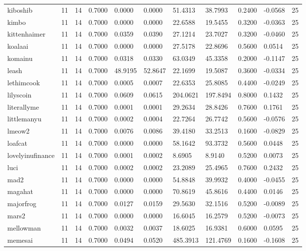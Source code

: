 \begin{table}[htbp]
\begin{tabular}{lllllllllll}
kiboshib & 11 & 14 & 0.7000 & 0.0000 & 0.0000 & 51.4313 & 38.7993 & 0.2400 & -0.0568 & 25 \\
kimbo & 11 & 14 & 0.7000 & 0.0000 & 0.0000 & 22.6588 & 19.5455 & 0.3200 & -0.0363 & 25 \\
kittenhaimer & 11 & 14 & 0.7000 & 0.0359 & 0.0390 & 27.1214 & 23.7027 & 0.3200 & -0.0460 & 25 \\
koalaai & 11 & 14 & 0.7000 & 0.0000 & 0.0000 & 27.5178 & 22.8696 & 0.5600 & 0.0514 & 25 \\
komainu & 11 & 14 & 0.7000 & 0.0318 & 0.0330 & 63.0349 & 45.3358 & 0.2000 & -0.1147 & 25 \\
leash & 11 & 14 & 0.7000 & 48.9195 & 52.8647 & 22.1699 & 19.5087 & 0.3600 & -0.0334 & 25 \\
lethimcook & 11 & 14 & 0.7000 & 0.0005 & 0.0007 & 22.6353 & 25.8085 & 0.4400 & -0.0249 & 25 \\
lilyscoin & 11 & 14 & 0.7000 & 0.0609 & 0.0615 & 204.0621 & 197.8494 & 0.8000 & 0.1432 & 25 \\
literallyme & 11 & 14 & 0.7000 & 0.0001 & 0.0001 & 29.2634 & 28.8426 & 0.7600 & 0.1761 & 25 \\
littlemanyu & 11 & 14 & 0.7000 & 0.0002 & 0.0004 & 22.7264 & 26.7742 & 0.5600 & -0.0576 & 25 \\
lmeow2 & 11 & 14 & 0.7000 & 0.0076 & 0.0086 & 39.4180 & 33.2513 & 0.1600 & -0.0829 & 25 \\
loafcat & 11 & 14 & 0.7000 & 0.0000 & 0.0000 & 58.1642 & 93.3732 & 0.5600 & 0.0448 & 25 \\
lovelyinufinance & 11 & 14 & 0.7000 & 0.0001 & 0.0002 & 8.6905 & 8.9140 & 0.5200 & 0.0073 & 25 \\
luci & 11 & 14 & 0.7000 & 0.0002 & 0.0002 & 23.2089 & 25.4965 & 0.7600 & 0.2432 & 25 \\
mad2 & 11 & 14 & 0.7000 & 0.0000 & 0.0000 & 54.8848 & 39.9932 & 0.4000 & -0.0455 & 25 \\
magahat & 11 & 14 & 0.7000 & 0.0000 & 0.0000 & 70.8619 & 45.8616 & 0.4400 & 0.0146 & 25 \\
majorfrog & 11 & 14 & 0.7000 & 0.0127 & 0.0159 & 29.5630 & 32.1516 & 0.5200 & -0.0089 & 25 \\
mars2 & 11 & 14 & 0.7000 & 0.0000 & 0.0000 & 16.6045 & 16.2579 & 0.5200 & -0.0073 & 25 \\
mellowman & 11 & 14 & 0.7000 & 0.0032 & 0.0037 & 18.6025 & 16.9381 & 0.6000 & 0.0595 & 25 \\
memesai & 11 & 14 & 0.7000 & 0.0494 & 0.0520 & 485.3913 & 121.4769 & 0.1600 & -0.1608 & 25 \\

\end{tabular}
\end{table}
